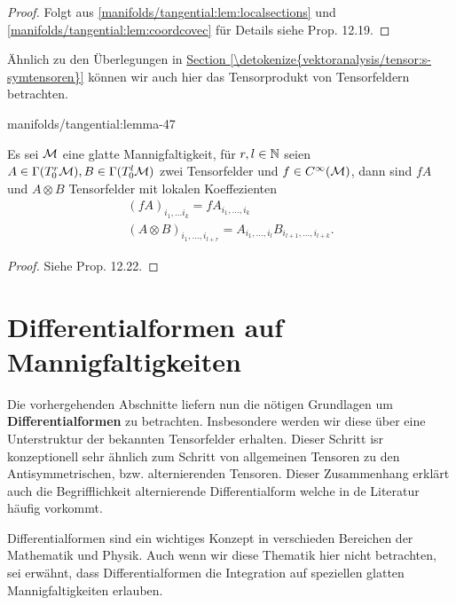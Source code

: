 \begin{proof}
 Folgt aus \cref{manifolds/tangential:lem:localsections} und \cref{manifolds/tangential:lem:coordcovec}   für Details siehe \cite{Lee03} Prop. 12.19.
\end{proof}

\par
Ähnlich zu den Überlegungen in \hyperref[\detokenize{vektoranalysis/tensor:s-symtensoren}]{Section \ref{\detokenize{vektoranalysis/tensor:s-symtensoren}}} können wir auch hier das Tensorprodukt von Tensorfeldern betrachten.
\begin{lemma}{}{manifolds/tangential:lemma-47}



\par
Es sei \(\mathcal{M}\) eine glatte Mannigfaltigkeit, für \(r,l\in \mathbb{N}\) seien \(A\in \Gamma(T^r_0\mathcal{M}), B\in \Gamma(T^l_0\mathcal{M})\) zwei Tensorfelder und \(f\in C^\infty(\mathcal{M})\), dann sind \(fA\) und \(A\otimes B\) Tensorfelder mit lokalen Koeffezienten
\begin{align*}
(fA)_{i_1,\ldots i_{k}} = f A_{i_1,\ldots, i_k}\\
(A\otimes B)_{i_1,\ldots,i_{l+r}} = A_{i_1,\ldots, i_l} B_{i_{l+1},\ldots, i_{l+k}}.
\end{align*}\end{lemma}

\begin{proof}
 Siehe \cite{Lee03} Prop. 12.22.
\end{proof}


\section{Differentialformen auf Mannigfaltigkeiten}
\label{\detokenize{manifolds/diffformen:differentialformen-auf-mannigfaltigkeiten}}\label{\detokenize{manifolds/diffformen::doc}}
\par
Die vorhergehenden Abschnitte liefern nun die nötigen Grundlagen um \textbf{Differentialformen} zu betrachten. Insbesondere werden wir diese über eine Unterstruktur der bekannten Tensorfelder erhalten. Dieser Schritt isr konzeptionell sehr ähnlich zum Schritt von allgemeinen Tensoren zu den Antisymmetrischen, bzw. alternierenden Tensoren. Dieser Zusammenhang erklärt auch die Begrifflichkeit alternierende Differentialform welche in de Literatur häufig vorkommt.

\par
Differentialformen sind ein wichtiges Konzept in verschieden Bereichen der Mathematik und Physik. Auch wenn wir diese Thematik hier nicht betrachten, sei erwähnt, dass Differentialformen die Integration auf speziellen glatten Mannigfaltigkeiten erlauben.


